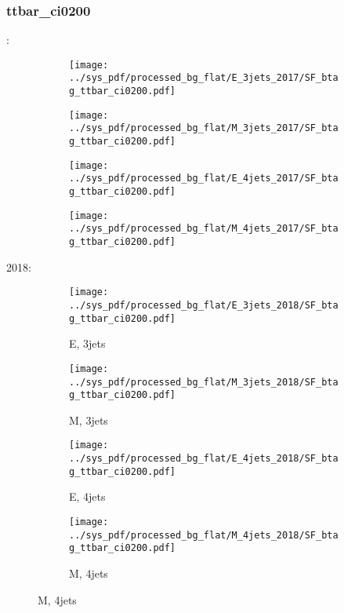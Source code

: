 \documentclass{beamer}
\begin{document}
\begin{frame}
\frametitle{ttbar_ci0200}
\fontsize{5}{1}:
\begin{figure}
\centering
\begin{subfigure}[b]{0.24\textwidth}
\texttt{[image: ../sys\_pdf/processed\_bg\_flat/E\_3jets\_2017/SF\_btag\_ttbar\_ci0200.pdf]}
\end{subfigure}
\begin{subfigure}[b]{0.24\textwidth}
\texttt{[image: ../sys\_pdf/processed\_bg\_flat/M\_3jets\_2017/SF\_btag\_ttbar\_ci0200.pdf]}
\end{subfigure}
\begin{subfigure}[b]{0.24\textwidth}
\texttt{[image: ../sys\_pdf/processed\_bg\_flat/E\_4jets\_2017/SF\_btag\_ttbar\_ci0200.pdf]}
\end{subfigure}
\begin{subfigure}[b]{0.24\textwidth}
\texttt{[image: ../sys\_pdf/processed\_bg\_flat/M\_4jets\_2017/SF\_btag\_ttbar\_ci0200.pdf]}
\end{subfigure}
\end{figure}
2018:
\begin{figure}
\centering
\begin{subfigure}[b]{0.24\textwidth}
\texttt{[image: ../sys\_pdf/processed\_bg\_flat/E\_3jets\_2018/SF\_btag\_ttbar\_ci0200.pdf]}
\captionsetup{font=tiny}
\caption{E, 3jets}
\end{subfigure}
\begin{subfigure}[b]{0.24\textwidth}
\texttt{[image: ../sys\_pdf/processed\_bg\_flat/M\_3jets\_2018/SF\_btag\_ttbar\_ci0200.pdf]}
\captionsetup{font=tiny}
\caption{M, 3jets}
\end{subfigure}
\begin{subfigure}[b]{0.24\textwidth}
\texttt{[image: ../sys\_pdf/processed\_bg\_flat/E\_4jets\_2018/SF\_btag\_ttbar\_ci0200.pdf]}
\captionsetup{font=tiny}
\caption{E, 4jets}
\end{subfigure}
\begin{subfigure}[b]{0.24\textwidth}
\texttt{[image: ../sys\_pdf/processed\_bg\_flat/M\_4jets\_2018/SF\_btag\_ttbar\_ci0200.pdf]}
\captionsetup{font=tiny}
\caption{M, 4jets}
\end{subfigure}
\end{figure}
\end{frame}
\end{document}
